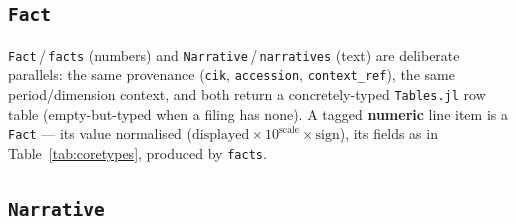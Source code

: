\documentclass[11pt,a4paper]{report}
\begin{document}
\subsection{\texttt{Fact}}

\noindent \texttt{Fact}\,/\,\texttt{facts} (numbers) and \texttt{Narrative}\,/\,\texttt{narratives} (text)
are deliberate parallels: the same provenance (\texttt{cik}, \texttt{accession}, \texttt{context\_ref}), the
same period/dimension context, and both return a concretely-typed \texttt{Tables.jl} row table
(empty-but-typed when a filing has none). A tagged \textbf{numeric} line item is a \texttt{Fact} --- its value
normalised (\(\mathrm{displayed}\times10^{\mathrm{scale}}\times\mathrm{sign}\)), its fields as in
Table~\ref{tab:coretypes}, produced by \texttt{facts}.

\subsection{\texttt{Narrative}}
\end{document}
